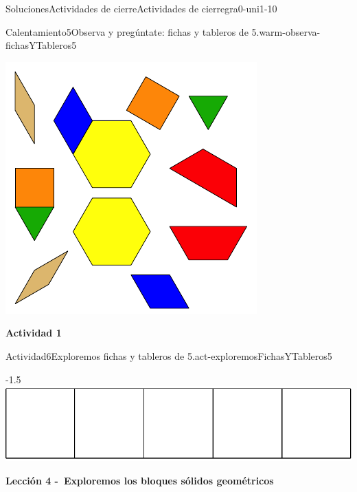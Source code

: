 \documentclass[twoside,10pt,]{article}
\begin{document}
\begin{solutions-section}{Soluciones}{Actividades de cierre}{}{Actividades de cierre}{}{}{gra0-uni1-10}
\begin{explorationsolution}{Calentamiento}{5}{Observa y pregúntate: fichas y tableros de 5.}{warm-observa-fichasYTableros5}
\begin{sidebyside}{2}{0.05}{0.05}{0.1}
\begin{sbspanel}{0.4}
\end{sbspanel}%
\begin{sbspanel}{0.4}%
\includegraphics[width=\linewidth]{external/svg-source/tikz-file-147344.pdf}
\end{sbspanel}%
\end{sidebyside}%
\end{explorationsolution}%
\par\medskip
\noindent\textbf{\large{}\space\textperiodcentered\space{}Actividad 1}
\begin{activitysolution}{Actividad}{6}{Exploremos fichas y tableros de 5.}{act-exploremosFichasYTableros5}%
\begin{image}{0}{1}{0}{-1.5\baselineskip}%
\includegraphics[width=\linewidth]{external/svg-source/tikz-file-148144.pdf}
\end{image}%
\end{activitysolution}%
\par\medskip
\noindent\textbf{\large{}\space\textperiodcentered\space{}Lección 4 -~Exploremos los bloques sólidos geométricos\\
}
\end{solutions-section}
\end{document}
